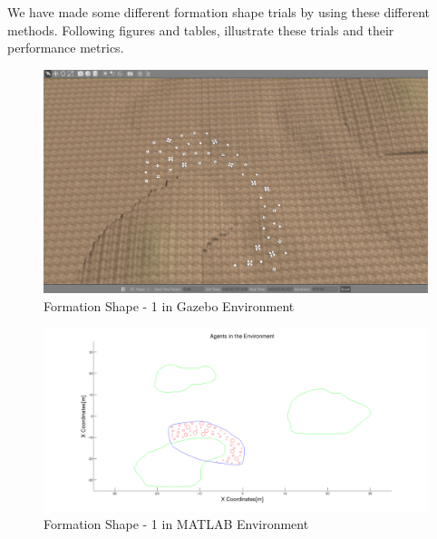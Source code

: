We have made some different formation shape trials by using these different methods. Following figures and tables, illustrate these trials and their performance metrics.

\begin{figure}[H]
\caption{Formation Shape - 1 in Gazebo Environment}
\centerline{\includegraphics[scale = 0.32]{1_Gazebo}}
\end{figure} 
			
\begin{figure}[H]
\caption{Formation Shape - 1 in MATLAB Environment}
\centerline{\includegraphics[scale = 0.32]{1}}
\end{figure} 
			
